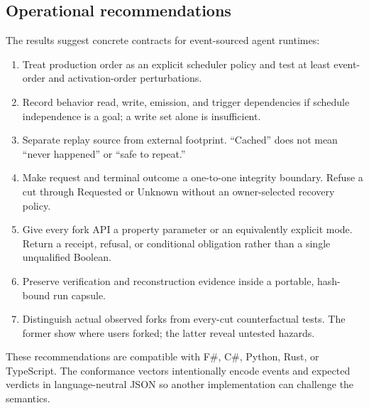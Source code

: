 \subsection{Operational recommendations}

The results suggest concrete contracts for event-sourced agent runtimes:

\begin{enumerate}[leftmargin=*]
  \item Treat production order as an explicit scheduler policy and test at
  least event-order and activation-order perturbations.
  \item Record behavior read, write, emission, and trigger dependencies if
  schedule independence is a goal; a write set alone is insufficient.
  \item Separate replay source from external footprint.  ``Cached'' does not
  mean ``never happened'' or ``safe to repeat.''
  \item Make request and terminal outcome a one-to-one integrity boundary.
  Refuse a cut through Requested or Unknown without an owner-selected recovery
  policy.
  \item Give every fork API a property parameter or an equivalently explicit
  mode.  Return a receipt, refusal, or conditional obligation rather than a
  single unqualified  Boolean.
  \item Preserve verification and reconstruction evidence inside a portable,
  hash-bound run capsule.
  \item Distinguish actual observed forks from every-cut counterfactual tests.
  The former show where users forked; the latter reveal untested hazards.
\end{enumerate}

These recommendations are compatible with F\#, C\#, Python, Rust, or
TypeScript.  The conformance vectors intentionally encode events and expected
verdicts in language-neutral JSON so another implementation can challenge the
semantics.
